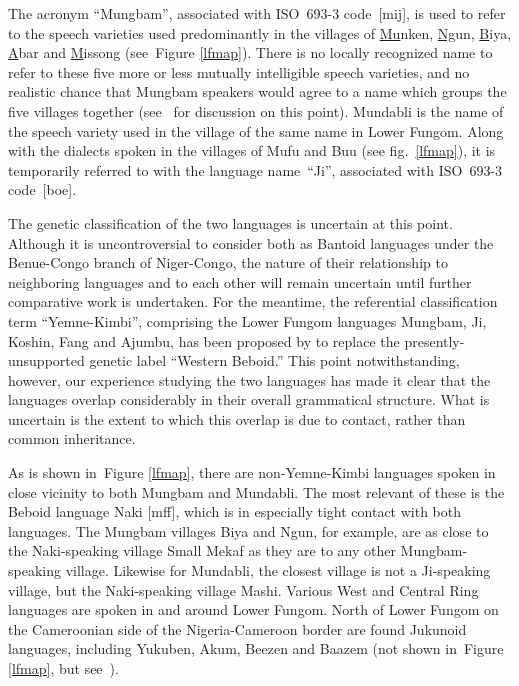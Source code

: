 \documentclass[10pt,twoside]{article}
\newcommand{\fref}[1]{Figure \ref{#1}}
\begin{document}
The acronym ``{Mungbam}'', 
associated with ISO~693-3 code~[mij], is used to refer to the speech varieties used
predominantly
in the villages of \uline{Mu}nken, \uline{Ng}un, \uline{B}iya,
\uline{A}bar and \uline{M}issong (see~\fref{lfmap}). 
There is no locally recognized name to refer to
these five more or less mutually intelligible speech varieties,
and no realistic chance that Mungbam speakers would agree
to a name which groups the five villages together (see~\cite{ideologies}
for discussion on this point).
Mundabli is the name of the speech variety used in the village of the
same name in Lower Fungom. Along with the dialects spoken in the
villages of Mufu and Buu (see fig.~\ref{lfmap}), it is temporarily
referred to with the language name~``Ji'', associated with ISO~693-3
code~[boe].
%

The genetic classification of the two languages is uncertain at this point.  
Although it is uncontroversial
to consider both as Bantoid languages under the Benue-Congo branch of Niger-Congo,
the nature of their relationship to neighboring languages
and to each other will remain uncertain until further comparative work
is undertaken. For the meantime, the referential classification term
``Yemne-Kimbi'', comprising
the Lower Fungom languages Mungbam, Ji, Koshin, Fang and Ajumbu, has been proposed by
\cite{good:inprep} to replace the presently-unsupported genetic label ``Western Beboid.''
This point notwithstanding, however, our experience studying the two
languages has made it clear that the languages overlap considerably
in their overall grammatical structure. What is uncertain is the extent
to which this overlap is due to contact, rather than common inheritance.

As is shown in~\fref{lfmap}, there are non-Yemne-Kimbi languages spoken in close
vicinity to both Mungbam and Mundabli. The most relevant of these is
the Beboid language Naki [mff], which is in especially tight contact
with both languages. The Mungbam villages Biya and Ngun, for example,
are as close to the Naki-speaking village Small Mekaf as they are
to any other Mungbam-speaking village. Likewise for Mundabli, the
closest village is not a Ji-speaking village, but the Naki-speaking
village Mashi. Various West and Central Ring languages are spoken
in and around Lower Fungom. North of Lower Fungom on the Cameroonian
side of the Nigeria-Cameroon border are found Jukunoid languages, including
Yukuben, Akum, Beezen and Baazem (not shown in~\fref{lfmap},
but see~\cite{breton:1993}).
\end{document}
